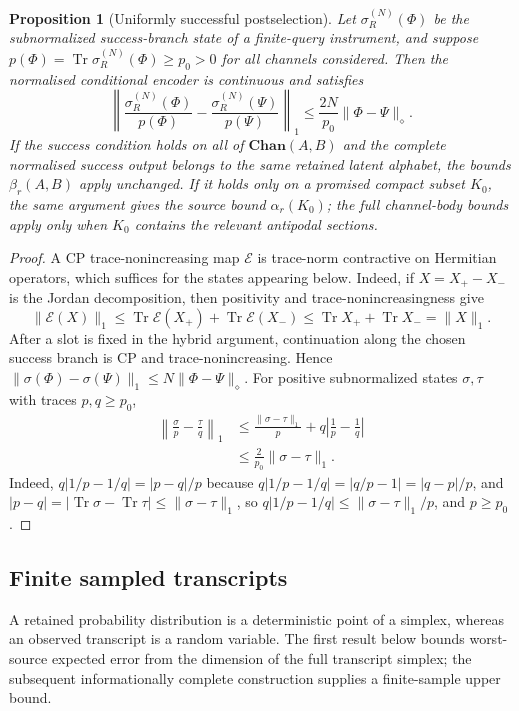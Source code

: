 \documentclass[11pt,a4paper]{article}
\theoremstyle{definition}
\theoremstyle{plain}
\newtheorem{proposition}[theorem]{Proposition}
\theoremstyle{remark}
\DeclareMathOperator{\Tr}{Tr}
\newcommand{\Chan}{\mathbf{Chan}}
\begin{document}
\begin{proposition}[Uniformly successful postselection]
\label{prop:postselection}
Let $\sigma_R^{(N)}(\Phi)$ be the subnormalized success-branch state of a
finite-query instrument, and suppose
$p(\Phi)=\Tr\sigma_R^{(N)}(\Phi)\geq p_0>0$ for all channels considered.
Then the normalised conditional encoder is continuous and satisfies
\[
\left\|
\frac{\sigma_R^{(N)}(\Phi)}{p(\Phi)}
-
\frac{\sigma_R^{(N)}(\Psi)}{p(\Psi)}
\right\|_1
\leq\frac{2N}{p_0}\|\Phi-\Psi\|_\diamond.
\]
If the success condition holds on all of $\Chan(A,B)$ and the complete
normalised success output belongs to the same retained latent alphabet, the
bounds $\beta_r(A,B)$ apply unchanged. If it holds only on a promised
compact subset $K_0$, the same argument gives the source bound
$\alpha_r(K_0)$; the full channel-body bounds apply only when $K_0$ contains
the relevant antipodal sections.
\end{proposition}

\begin{proof}
A CP trace-nonincreasing map $\mathcal E$ is trace-norm contractive on
Hermitian operators, which suffices for the states appearing below. Indeed, if $X=X_+-X_-$ is the Jordan decomposition,
then positivity and trace-nonincreasingness give
\[
\|\mathcal E(X)\|_1
\leq\Tr\mathcal E(X_+)+\Tr\mathcal E(X_-)
\leq\Tr X_++\Tr X_-=\|X\|_1.
\]
After a slot is fixed in the hybrid argument, continuation along the chosen
success branch is CP and trace-nonincreasing. Hence
$\|\sigma(\Phi)-\sigma(\Psi)\|_1\leq
N\|\Phi-\Psi\|_\diamond$. For positive subnormalized states $\sigma,\tau$
with traces $p,q\geq p_0$,
\begin{align*}
\left\|\frac\sigma p-\frac\tau q\right\|_1
&\leq\frac{\|\sigma-\tau\|_1}{p}
+q\left|\frac1p-\frac1q\right|\\
&\leq\frac{2}{p_0}\|\sigma-\tau\|_1.
\end{align*}
Indeed,
$q|1/p-1/q|=|p-q|/p$ because $q|1/p-1/q|=|q/p-1|=|q-p|/p$, and $|p-q|=|\Tr\sigma-\Tr\tau|\le\|\sigma-\tau\|_1$, so $q|1/p-1/q|\le\|\sigma-\tau\|_1/p$, and
$p\geq p_0$.
\end{proof}

\subsection{Finite sampled transcripts}

A retained probability distribution is a deterministic point of a simplex,
whereas an observed transcript is a random variable. The first result below
bounds worst-source expected error from the dimension of the full transcript
simplex; the subsequent informationally complete construction supplies a
finite-sample upper bound.
\end{document}
